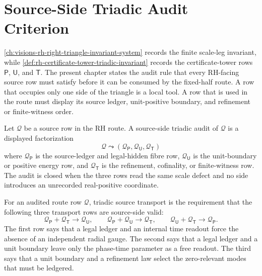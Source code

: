 \chapter{Source-Side Triadic Audit Criterion}
\label{ch:visions-rh-source-side-triadic-audit-criterion}

\autoref{ch:visions-rh-right-triangle-invariant-system} records the
finite scale-leg invariant, while
\autoref{def:rh-certificate-tower-triadic-invariant} records the
certificate-tower rows $\mathsf P$, $\mathsf U$, and $\mathsf T$.  The
present chapter states the audit rule that every RH-facing source row
must satisfy before it can be consumed by the fixed-half route.  A row
that occupies only one side of the triangle is a local tool.  A row
that is used in the route must display its source ledger, unit-positive
boundary, and refinement or finite-witness order.

\begin{definition}
\label{def:rh-source-side-triadic-audit-route-row}
Let $\mathcal Q$ be a source row in the RH route.  A source-side triadic
audit of $\mathcal Q$ is a displayed factorization
$$
\mathcal Q
\leadsto
(\mathcal Q_{\mathsf P},\mathcal Q_{\mathsf U},\mathcal Q_{\mathsf T})
$$
where $\mathcal Q_{\mathsf P}$ is the source-ledger and legal-hidden
fibre row, $\mathcal Q_{\mathsf U}$ is the unit-boundary or positive
energy row, and $\mathcal Q_{\mathsf T}$ is the refinement, cofinality,
or finite-witness row.  The audit is closed when the three rows read the
same scale defect and no side introduces an unrecorded real-positive
coordinate.
\end{definition}

\begin{definition}
\label{def:rh-triadic-source-transport}
For an audited route row $\mathcal Q$, triadic source transport is the
requirement that the following three transport rows are source-side
valid:
$$
\mathcal Q_{\mathsf P}+\mathcal Q_{\mathsf T}\to\mathcal Q_{\mathsf U},
\qquad
\mathcal Q_{\mathsf P}+\mathcal Q_{\mathsf U}\to\mathcal Q_{\mathsf T},
\qquad
\mathcal Q_{\mathsf U}+\mathcal Q_{\mathsf T}\to\mathcal Q_{\mathsf P}.
$$
The first row says that a legal ledger and an internal time readout
force the absence of an independent radial gauge.  The second says that
a legal ledger and a unit boundary leave only the phase-time parameter
as a free readout.  The third says that a unit boundary and a refinement
law select the zero-relevant modes that must be ledgered.
\end{definition}

